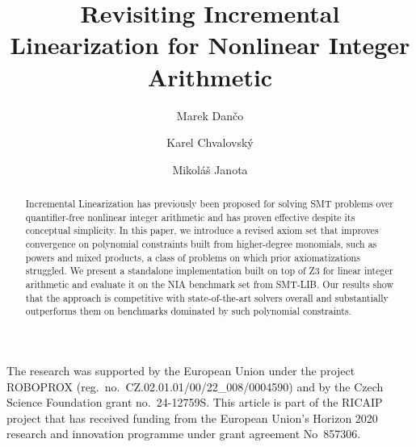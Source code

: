 \documentclass[runningheads]{llncs}
\title{Revisiting Incremental Linearization for Nonlinear Integer Arithmetic}
\author{Marek Dan\v{c}o\orcidID{0009-0008-3031-113X} \and
Karel Chvalovsk\'{y}\orcidID{0000-0002-0541-3889} \and
Mikol\'{a}\v{s} Janota\orcidID{0000-0003-3487-784X}}
\institute{Czech Technical University in Prague}
\numberwithin{table}{section}
\begin{document}
\maketitle

\begin{abstract}
	Incremental Linearization has previously been proposed for solving SMT problems over quantifier-free
	nonlinear integer arithmetic and has proven effective despite its conceptual simplicity.
	In this paper, we introduce a revised axiom set that improves convergence on polynomial constraints
	built from higher-degree monomials, such as powers and mixed products,
	a class of problems on which prior axiomatizations struggled. We present a standalone implementation
	built on top of Z3 for linear integer arithmetic and evaluate it on the NIA benchmark set from SMT-LIB.
	Our results show that the approach is competitive with state-of-the-art solvers overall and
	substantially outperforms them on benchmarks dominated by such polynomial constraints.
\end{abstract}










\begin{credits}
\subsubsection{\ackname}
The research was supported by the European Union under the project
ROBOPROX (reg.\ no.\ CZ.02.01.01/00/22\_008/0004590) and by the Czech
Science Foundation grant no.~24-12759S.
This article is part of the RICAIP project that has received funding from the
European Union's Horizon 2020 research and innovation programme under grant
agreement No~857306.
\end{credits}



\end{document}
